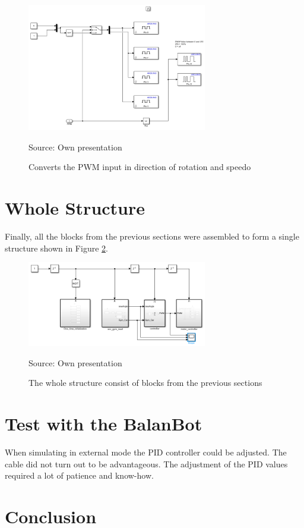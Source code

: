 	\begin{figure}[H]
		\centering
		\includegraphics[width=0.7\textwidth]{figures/act.PNG}
		\caption{Converts the PWM input in direction of rotation and speedo}	
		Source: Own presentation	
		\label{fig:act}	
	\end{figure}


\section{Whole Structure}
Finally, all the blocks from the previous sections were assembled to form a single structure shown in Figure \ref{fig:struct}.

	\begin{figure}[!htbp]
		\centering
		\includegraphics[width=0.7\textwidth]{figures/struct.PNG}
		\caption{The whole structure consist of blocks from the previous sections}	
		Source: Own presentation	
		\label{fig:struct}	
	\end{figure}

\section{Test with the BalanBot}
When simulating in external mode the PID controller could be adjusted. The cable did not turn out to be advantageous.
The adjustment of the PID values required a lot of patience and know-how.

\section{Conclusion}




